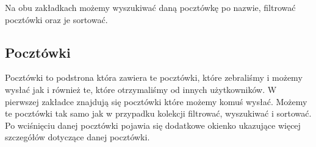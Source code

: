 \documentclass[a4paper,twoside,12pt]{book}
\begin{document}
Na obu zakładkach możemy wyszukiwać daną pocztówkę po nazwie, filtrować pocztówki oraz je sortować. 

\subsection{Pocztówki}
Pocztówki to podstrona która zawiera te pocztówki, które zebraliśmy i możemy wysłać jak i również te, które otrzymaliśmy od innych użytkowników. W pierwszej zakładce znajdują się pocztówki które możemy komuś wysłać. Możemy te pocztówki tak samo jak w przypadku kolekcji filtrować, wyszukiwać i sortować. Po wciśnięciu danej pocztówki pojawia się dodatkowe okienko ukazujące więcej szczegółów dotyczące danej pocztówki. 

\begin{figure}[H]
  \centering
  \begin{minipage}[b]{0.49\textwidth}

\end{minipage}
\end{figure}
\end{document}
